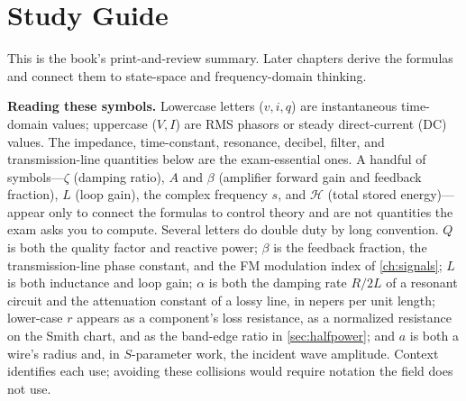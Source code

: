 \chapter{Study Guide}
\label{ch:studyguide}
This is the book's print-and-review summary. Later chapters derive the formulas
and connect them to state-space and frequency-domain thinking.

\textbf{Reading these symbols.} Lowercase letters (\(v,i,q\)) are instantaneous
time-domain values; uppercase (\(V,I\)) are RMS phasors or steady direct-current
(DC) values. The
impedance, time-constant, resonance, decibel, filter, and transmission-line
quantities below are the exam-essential ones. A handful of symbols---\(\zeta\)
(damping ratio), \(A\) and \(\beta\) (amplifier forward gain and feedback
fraction), \(L\) (loop gain), the complex frequency \(s\), and \(\mathcal{H}\)
(total stored energy)---appear only to connect the formulas to control theory and
are not quantities the exam asks you to compute. Several letters do double duty by
long convention. \(Q\) is both
the quality factor and reactive power; \(\beta\) is the feedback fraction, the
transmission-line phase constant, and the FM modulation index of
\cref{ch:signals}; \(L\) is both inductance and loop gain; \(\alpha\)
is both the damping rate \(R/2L\) of a resonant circuit and the attenuation constant of
a lossy line, in nepers per unit length; lower-case \(r\) appears as a component's loss
resistance, as a normalized resistance on the Smith chart, and as the band-edge ratio in
\cref{sec:halfpower}; and \(a\) is both a wire's radius and, in \(S\)-parameter work,
the incident wave amplitude. Context identifies each use; avoiding these collisions
would require notation the field does not use.

